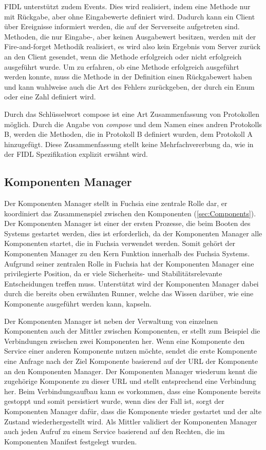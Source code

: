 \documentclass[a4paper]{scrartcl}
\begin{document}
FIDL unterstützt zudem Events. Dies wird realisiert, indem eine Methode nur mit Rückgabe, aber ohne Eingabewerte definiert wird. Dadurch kann ein Client über Ereignisse informiert werden, die auf der Serverseite aufgetreten sind. Methoden, die nur Eingabe-, aber keinen Ausgabewert besitzen, werden mit der Fire-and-forget Methodik realisiert, es wird also kein Ergebnis vom Server zurück an den Client gesendet, wenn die Methode erfolgreich oder nicht erfolgreich ausgeführt wurde. Um zu erfahren, ob eine Methode erfolgreich ausgeführt werden konnte, muss die Methode in der Definition einen Rückgabewert haben und kann wahlweise auch die Art des Fehlers zurückgeben, der durch ein Enum oder eine Zahl definiert wird. \cite{Fuchsia.FIDL.Specitifcation}

Durch das Schlüsselwort compose ist eine Art Zusammenfassung von Protokollen möglich. Durch die Angabe von \textit{compose} und dem Namen eines andren Protokolls B, werden die Methoden, die in Protokoll B definiert wurden, dem Protokoll A hinzugefügt. Diese Zusammenfassung stellt keine Mehrfachvererbung da, wie in der FIDL Spezifikation explizit erwähnt wird. \cite{Fuchsia.FIDL.Specitifcation}
\subsection{Komponenten Manager}
Der Komponenten Manager stellt in Fuchsia eine zentrale Rolle dar, er koordiniert das Zusammenspiel zwischen den Komponenten (\ref{sec:Components}). Der Komponenten Manager ist einer der ersten Prozesse, die beim Booten des Systems gestartet werden, dies ist erforderlich, da der Komponenten Manager alle Komponenten startet, die in Fuchsia verwendet werden. Somit gehört der Komponenten Manager zu den Kern Funktion innerhalb des Fuchsia Systems. Aufgrund seiner zentralen Rolle in Fuchsia hat der Komponenten Manager eine privilegierte Position, da er viele Sicherheits- und Stabilitätsrelevante Entscheidungen treffen muss. Unterstützt wird der Komponenten Manager dabei durch die bereits oben erwähnten Runner, welche das Wissen darüber, wie eine Komponente ausgeführt werden kann, kapseln.

Der Komponenten Manager ist neben der Verwaltung von einzelnen Komponenten auch der Mittler zwischen Komponenten, er stellt zum Beispiel die Verbindungen zwischen zwei Komponenten her. Wenn eine Komponente den Service einer anderen Komponente nutzen möchte, sendet die erste Komponente eine Anfrage nach der Ziel Komponente basierend auf der URL der Komponente an den Komponenten Manager. Der Komponenten Manager wiederum kennt die zugehörige Komponente zu dieser URL und stellt entsprechend eine Verbindung her. Beim Verbindungsaufbau kann es vorkommen, dass eine Komponente bereits gestoppt und somit persistiert wurde, wenn dies der Fall ist, sorgt der Komponenten Manager dafür, dass die Komponente wieder gestartet und der alte Zustand wiederhergestellt wird. Als Mittler validiert der Komponenten Manager auch jeden Aufruf zu einem Service basierend auf den Rechten, die im Komponenten Manifest festgelegt wurden. \cite{Fuchsia.Component.Lifecycle}\cite{Fuchsia.Component.Topology}
\end{document}
